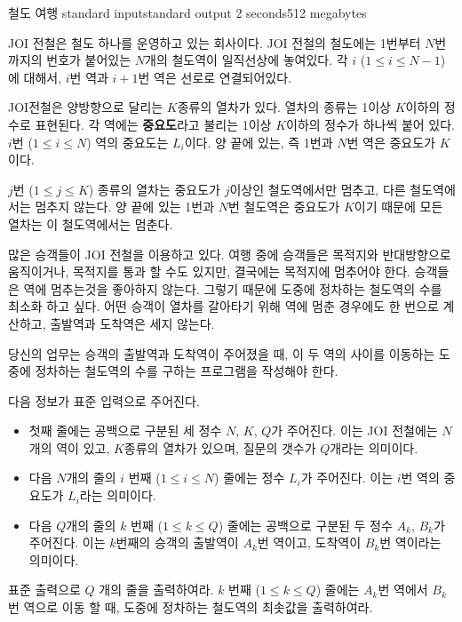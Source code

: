 \begin{problem}{철도 여행}
	{standard input}{standard output}
	{2 seconds}{512 megabytes}{}
	
	JOI 전철은 철도 하나를 운영하고 있는 회사이다. JOI 전철의 철도에는 1번부터 $N$번 까지의 번호가 붙어있는 $N$개의 철도역이 일직선상에 놓여있다. 각 $i$ ($1 \le i \le N-1$)에 대해서, $i$번 역과 $i+1$번 역은 선로로 연결되어있다.
	
	JOI전철은 양방향으로 달리는 $K$종류의 열차가 있다. 열차의 종류는 1이상 $K$이하의 정수로 표현된다. 각 역에는 \textbf{중요도}라고 불리는 1이상 $K$이하의 정수가 하나씩 붙어 있다. $i$번 ($1 \le i \le N$) 역의 중요도는 $L_i$이다. 양 끝에 있는, 즉 1번과 $N$번 역은 중요도가 $K$이다.
	
	$j$번 ($1 \le j \le K$) 종류의 열차는 중요도가 $j$이상인 철도역에서만 멈추고, 다른 철도역에서는 멈추지 않는다. 양 끝에 있는 1번과 $N$번 철도역은 중요도가 $K$이기 때문에 모든 열차는 이 철도역에서는 멈춘다.
	
	많은 승객들이 JOI 전철을 이용하고 있다. 여행 중에 승객들은 목적지와 반대방향으로 움직이거나, 목적지를 통과 할 수도 있지만, 결국에는 목적지에 멈추어야 한다. 승객들은 역에 멈추는것을 좋아하지 않는다. 그렇기 때문에 도중에 정차하는 철도역의 수를 최소화 하고 싶다. 어떤 승객이 열차를 갈아타기 위해 역에 멈춘 경우에도 한 번으로 계산하고, 출발역과 도착역은 세지 않는다.
	
	당신의 업무는 승객의 출발역과 도착역이 주어졌을 때, 이 두 역의 사이를 이동하는 도중에 정차하는 철도역의 수를 구하는 프로그램을 작성해야 한다.
	
	\InputFile
	
	다음 정보가 표준 입력으로 주어진다.
	
	\begin{itemize}
		\item 첫째 줄에는 공백으로 구분된 세 정수 $N$, $K$, $Q$가 주어진다. 이는 JOI 전철에는 $N$개의 역이 있고, $K$종류의 열차가 있으며, 질문의 갯수가 $Q$개라는 의미이다.
		\item 다음 $N$개의 줄의 $i$ 번째 ($1 \le i \le N$) 줄에는 정수 $L_i$가 주어진다. 이는 $i$번 역의 중요도가 $L_i$라는 의미이다.
		\item 다음 $Q$개의 줄의 $k$ 번째 ($1 \le k \le Q$) 줄에는 공백으로 구분된 두 정수 $A_k$, $B_k$가 주어진다. 이는 $k$번째의 승객의 출발역이 $A_k$번 역이고, 도착역이 $B_k$번 역이라는 의미이다.
	\end{itemize}
	
	
	\OutputFile
	
	표준 출력으로 $Q$ 개의 줄을 출력하여라. $k$ 번째 ($1 \le k \le Q$) 줄에는 $A_k$번 역에서 $B_k$번 역으로 이동 할 때, 도중에 정차하는 철도역의 최솟값을 출력하여라.
	

\end{problem}
